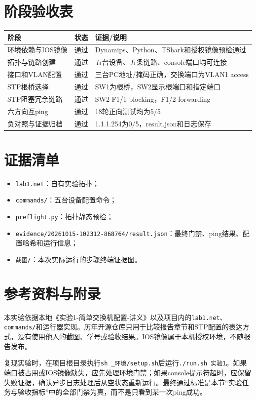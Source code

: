 \documentclass[UTF8,a4paper,12pt]{ctexart}
\begin{document}
\section{阶段验收表}
\begin{longtable}{p{}p{}p{}}
\toprule 阶段 & 状态 & 证据/说明\\\midrule
环境依赖与IOS镜像 & 通过 & Dynamips、Python、TShark和授权镜像预检通过\\
拓扑与链路创建 & 通过 & 五台设备、五条链路、console端口均可连接\\
接口和VLAN配置 & 通过 & 三台PC地址/掩码正确，交换端口为VLAN1 access\\
STP根桥选择 & 通过 & SW1为根桥，SW2显示根端口和指定端口\\
STP阻塞冗余链路 & 通过 & SW2 F1/1 blocking，F1/2 forwarding\\
六方向互ping & 通过 & 18轮正向测试均为5/5\\
负对照与证据归档 & 通过 & 1.1.1.254为0/5，result.json和日志保存\\
\bottomrule
\end{longtable}
\section{证据清单}
\begin{itemize}\item \texttt{lab1.net}：自有实验拓扑；\item \texttt{commands/}：五台设备配置命令；\item \texttt{preflight.py}：拓扑静态预检；\item \texttt{evidence/20261015-102312-868764/result.json}：最终门禁、ping结果、配置哈希和运行信息；\item \texttt{截图/}：本次实际运行的步骤终端证据图。\end{itemize}
\section{参考资料与附录}
本实验依据本地《实验1-简单交换机配置-讲义》以及项目内的\texttt{lab1.net}、\texttt{commands/}和运行器实现。历年开源仓库只用于比较报告章节和STP配置的表达方式，没有使用他人的截图、学号或验收结果。IOS镜像属于本机授权环境，不随报告发布。

复现实验时，在项目根目录执行\texttt{sh \_环境/setup.sh}后运行\texttt{./run.sh 实验1}。如果端口被占用或IOS镜像缺失，应先处理环境门禁；如果console提示符超时，应保留失败证据，确认异步日志处理后从空状态重新运行。最终通过标准是本节“实验任务与验收指标”中的全部门禁为真，而不是只看到某一次ping成功。
\end{document}
